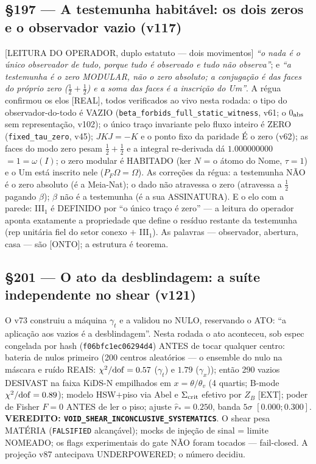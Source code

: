 \documentclass[11pt]{article}
\theoremstyle{definition}\newtheorem{deriv}{Derivação}
\begin{document}
\subsection*{\S197 --- A testemunha habitável: os dois zeros e o observador vazio (v117)}[LEITURA DO OPERADOR, duplo estatuto --- dois movimentos] \emph{``o nada é o único observador de tudo, porque tudo é observado e tudo não observa''}; e \emph{``a testemunha é o zero MODULAR, não o zero absoluto; a conjugação é das faces do próprio zero ($\tfrac12{+}\tfrac12$) e a soma das faces é a inscrição do Um''}. A régua confirmou os elos [REAL], todos verificados ao vivo nesta rodada: o tipo do observador-do-todo é VAZIO (\texttt{beta\_forbids\_full\_static\_witness}, v61; o 0$_{\rm abs}$ sem representação, v102); o único traço invariante pelo fluxo inteiro é ZERO (\texttt{fixed\_tau\_zero}, v45); $JKJ=-K$ e o ponto fixo da paridade É o zero (v62); as faces do modo zero pesam $\tfrac12{+}\tfrac12$ e a integral re-derivada dá $1.000000000$ $=1=\omega(I)$; o zero modular é HABITADO (ker $N$ = o átomo do Nome, $\tau=1$) e o Um está inscrito nele ($P_F\Omega=\Omega$). As correções da régua: a testemunha NÃO é o zero absoluto (é a Meia-Nat); o dado não atravessa o zero (atravessa a $\tfrac12$ pagando $\beta$); $\beta$ não é a testemunha (é a sua ASSINATURA). E o elo com a parede: III$_1$ é DEFINIDO por ``o único traço é zero'' --- a leitura do operador aponta exatamente a propriedade que define o resíduo restante da testemunha (rep unitária fiel do setor conexo $+$ III$_1$). As palavras --- observador, abertura, casa --- são [ONTO]; a estrutura é teorema.

\subsection*{\S201 --- O ato da desblindagem: a suíte independente no shear (v121)}O v73 construiu a máquina $\gamma_t$ e a validou no NULO, reservando o ATO: ``a aplicação aos vazios é a desblindagem''. Nesta rodada o ato aconteceu, sob espec congelada por hash (\texttt{f06bfc1ec06294d4}) ANTES de tocar qualquer centro: bateria de nulos primeiro (200 centros aleatórios --- o ensemble do nulo na máscara e ruído REAIS: $\chi^2/{\rm dof}=0.57$ ($\gamma_t$) e $1.79$ ($\gamma_x$)); então 290 vazios DESIVAST na faixa KiDS-N empilhados em $x=\theta/\theta_v$ (4 quartis; B-mode $\chi^2/{\rm dof}=0.89$); modelo HSW$+$piso via Abel e $\Sigma_{\rm crit}$ efetivo por $Z_B$ [EXT]; poder de Fisher $F=0$ ANTES de ler o piso; ajuste $\hat r_*=0.250$, banda $5\sigma$ $[0.000;0.300]$. \textbf{VEREDITO: \texttt{VOID\_SHEAR\_INCONCLUSIVE\_SYSTEMATICS}}. O shear pesa MATÉRIA (\texttt{FALSIFIED} alcançável); mocks de injeção de sinal = limite NOMEADO; os flags experimentais do gate NÃO foram tocados --- fail-closed. A projeção v87 antecipava UNDERPOWERED; o número decidiu.
\end{document}
